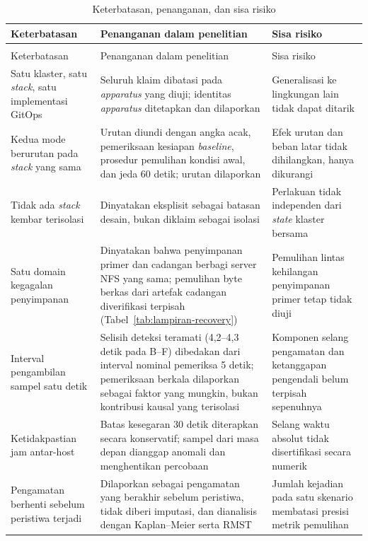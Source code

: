 \begin{longtable}{|>{\raggedright\arraybackslash}p{3.35cm}|>{\raggedright\arraybackslash}p{5.75cm}|>{\raggedright\arraybackslash}p{3.85cm}|}
  \caption{Keterbatasan, penanganan, dan sisa risiko}
  \label{tab:lampiran-keterbatasan}\\
  \hline
  Keterbatasan & Penanganan dalam penelitian & Sisa risiko \\
  \hline
  \endfirsthead
  \multicolumn{3}{l}{\scriptsize\itshape Lanjutan Tabel~\ref{tab:lampiran-keterbatasan}}\\
  \hline
  Keterbatasan & Penanganan dalam penelitian & Sisa risiko \\
  \hline
  \endhead
  \hline
  \endfoot
  Satu klaster, satu \textit{stack}, satu implementasi GitOps & Seluruh klaim dibatasi pada \textit{apparatus} yang diuji; identitas \textit{apparatus} ditetapkan dan dilaporkan & Generalisasi ke lingkungan lain tidak dapat ditarik \\
  \hline
  Kedua mode berurutan pada \textit{stack} yang sama & Urutan diundi dengan angka acak, pemeriksaan kesiapan \textit{baseline}, prosedur pemulihan kondisi awal, dan jeda 60 detik; urutan dilaporkan & Efek urutan dan beban latar tidak dihilangkan, hanya dikurangi \\
  \hline
  Tidak ada \textit{stack} kembar terisolasi & Dinyatakan eksplisit sebagai batasan desain, bukan diklaim sebagai isolasi & Perlakuan tidak independen dari \textit{state} klaster bersama \\
  \hline
  Satu domain kegagalan penyimpanan & Dinyatakan bahwa penyimpanan primer dan cadangan berbagi server NFS yang sama; pemulihan byte berkas dari artefak cadangan diverifikasi terpisah (Tabel~\ref{tab:lampiran-recovery}) & Pemulihan lintas kehilangan penyimpanan primer tetap tidak diuji \\
  \hline
  Interval pengambilan sampel satu detik & Selisih deteksi teramati (4,2--4,3 detik pada B--F) dibedakan dari interval nominal pemeriksa 5 detik; pemeriksaan berkala dilaporkan sebagai faktor yang mungkin, bukan kontribusi kausal yang terisolasi & Komponen selang pengamatan dan ketanggapan pengendali belum terpisah sepenuhnya \\
  \hline
  Ketidakpastian jam antar-host & Batas kesegaran 30 detik diterapkan secara konservatif; sampel dari masa depan dianggap anomali dan menghentikan percobaan & Selang waktu absolut tidak disertifikasi secara numerik \\
  \hline
  Pengamatan berhenti sebelum peristiwa terjadi & Dilaporkan sebagai pengamatan yang berakhir sebelum peristiwa, tidak diberi imputasi, dan dianalisis dengan Kaplan--Meier serta RMST & Jumlah kejadian pada satu skenario membatasi presisi metrik pemulihan \\

\end{longtable}
